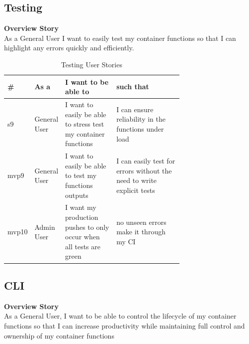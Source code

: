 \subsection{Testing}
\textbf{Overview Story}
\\As a General User I want to easily test my container functions so that I can highlight any errors quickly and efficiently.
\begin{table}[!ht]
\begin{tabular}{|l|l|p{0.3\linewidth}|p{0.4\linewidth}|}
\hline
\textbf{\#} & \textbf{As a} & \textbf{I want to be able to}                                      & \textbf{such that}                                                     \\ \hline
s9          & General User  & I want to easily be able to stress test my container functions     & I can ensure reliability in the functions under load                   \\ \hline
mvp9        & General User  & I want to easily be able to test my functions outputs              & I can easily test for errors without the need to write explicit tests \\ \hline
mvp10        & Admin User    & I want my production pushes to only occur when all tests are green & no unseen errors make it through my CI                                 \\ \hline
\end{tabular}
\caption{Testing User Stories}
\label{tab:test}
\end{table}
\clearpage
\subsection{CLI}
\textbf{Overview Story}
\\ As a General User, I want to be able to control the lifecycle of my container functions so that I can increase productivity while maintaining full control and ownership of my container functions

